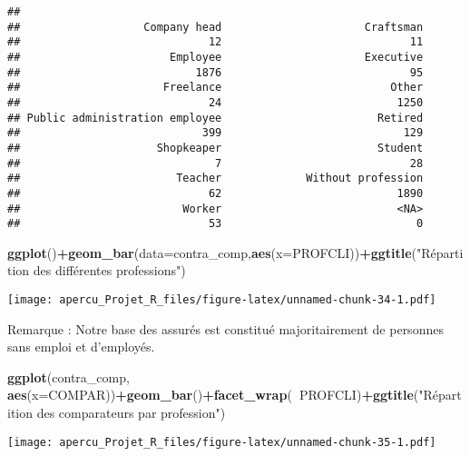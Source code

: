 \documentclass[
]{article}
\newenvironment{Shaded}{\begin{snugshade}}{\end{snugshade}}
\newcommand{\DataTypeTok}[1]{\textcolor[rgb]{0.13,0.29,0.53}{#1}}
\newcommand{\KeywordTok}[1]{\textcolor[rgb]{0.13,0.29,0.53}{\textbf{#1}}}
\newcommand{\NormalTok}[1]{#1}
\newcommand{\OperatorTok}[1]{\textcolor[rgb]{0.81,0.36,0.00}{\textbf{#1}}}
\newcommand{\StringTok}[1]{\textcolor[rgb]{0.31,0.60,0.02}{#1}}
\begin{document}
\begin{verbatim}
## 
##                   Company head                      Craftsman 
##                             12                             11 
##                       Employee                      Executive 
##                           1876                             95 
##                      Freelance                          Other 
##                             24                           1250 
## Public administration employee                        Retired 
##                            399                            129 
##                     Shopkeaper                        Student 
##                              7                             28 
##                        Teacher             Without profession 
##                             62                           1890 
##                         Worker                           <NA> 
##                             53                              0
\end{verbatim}

\begin{Shaded}
\begin{Highlighting}[]
\KeywordTok{ggplot}\NormalTok{()}\OperatorTok{+}\KeywordTok{geom_bar}\NormalTok{(}\DataTypeTok{data=}\NormalTok{contra_comp,}\KeywordTok{aes}\NormalTok{(}\DataTypeTok{x=}\NormalTok{PROFCLI))}\OperatorTok{+}\KeywordTok{ggtitle}\NormalTok{(}\StringTok{"Répartition des différentes professions"}\NormalTok{)}
\end{Highlighting}
\end{Shaded}

\texttt{[image: apercu\_Projet\_R\_files/figure-latex/unnamed-chunk-34-1.pdf]}

Remarque : Notre base des assurés est constitué majoritairement de
personnes sans emploi et d'employés.

\begin{Shaded}
\begin{Highlighting}[]
\KeywordTok{ggplot}\NormalTok{(contra_comp, }\KeywordTok{aes}\NormalTok{(}\DataTypeTok{x=}\NormalTok{COMPAR))}\OperatorTok{+}\KeywordTok{geom_bar}\NormalTok{()}\OperatorTok{+}\KeywordTok{facet_wrap}\NormalTok{(}\OperatorTok{~}\NormalTok{PROFCLI)}\OperatorTok{+}\KeywordTok{ggtitle}\NormalTok{(}\StringTok{"Répartition des comparateurs par profession"}\NormalTok{)}
\end{Highlighting}
\end{Shaded}

\texttt{[image: apercu\_Projet\_R\_files/figure-latex/unnamed-chunk-35-1.pdf]}
\end{document}
